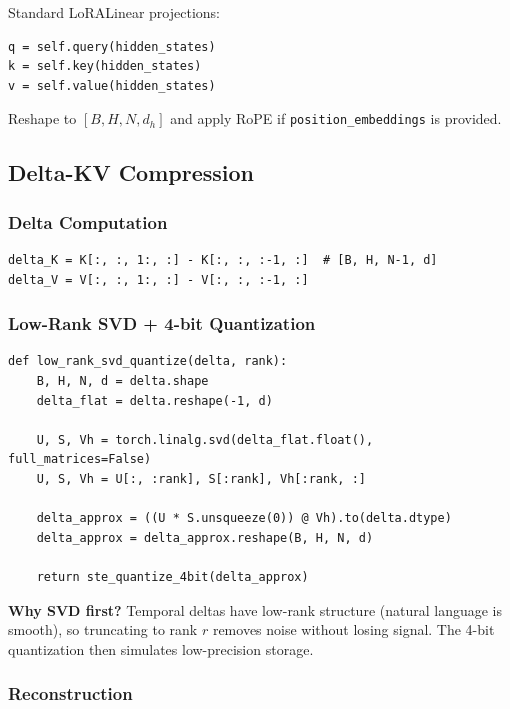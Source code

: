 Standard LoRALinear projections:

\begin{lstlisting}
q = self.query(hidden_states)
k = self.key(hidden_states)
v = self.value(hidden_states)
\end{lstlisting}

Reshape to $[B, H, N, d_h]$ and apply RoPE if \texttt{position\_embeddings} is provided.

\subsection{Delta-KV Compression}

\subsubsection{Delta Computation}

\begin{lstlisting}
delta_K = K[:, :, 1:, :] - K[:, :, :-1, :]  # [B, H, N-1, d]
delta_V = V[:, :, 1:, :] - V[:, :, :-1, :]
\end{lstlisting}

\subsubsection{Low-Rank SVD + 4-bit Quantization}

\begin{lstlisting}
def low_rank_svd_quantize(delta, rank):
    B, H, N, d = delta.shape
    delta_flat = delta.reshape(-1, d)
    
    U, S, Vh = torch.linalg.svd(delta_flat.float(), full_matrices=False)
    U, S, Vh = U[:, :rank], S[:rank], Vh[:rank, :]
    
    delta_approx = ((U * S.unsqueeze(0)) @ Vh).to(delta.dtype)
    delta_approx = delta_approx.reshape(B, H, N, d)
    
    return ste_quantize_4bit(delta_approx)
\end{lstlisting}

\textbf{Why SVD first?} Temporal deltas have low-rank structure (natural language is 
smooth), so truncating to rank $r$ removes noise without losing signal. The 
4-bit quantization then simulates low-precision storage.

\subsubsection{Reconstruction}

